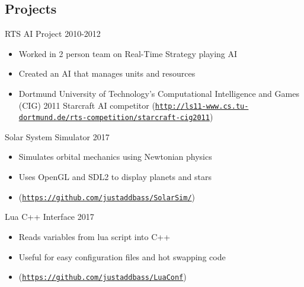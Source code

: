 \documentclass[line,margin]{res}
\begin{document}
\begin{resume}
\section{Projects}
\vspace{12pt}


RTS AI Project
\hfill 2010-2012
	\begin{itemize} \itemsep -2pt
	\item Worked in 2 person team on Real-Time Strategy playing AI
	\item Created an AI that manages units and resources
	\item Dortmund University of Technology’s Computational Intelligence and Games (CIG) 2011 Starcraft AI
        competitor (\href{http://ls11-www.cs.tu-dortmund.de/rts-competition/starcraft-cig2011}{\texttt{http://ls11-www.cs.tu-dortmund.de/rts-competition/starcraft-cig2011}})
	\end{itemize}

\vspace{6pt}
Solar System Simulator
\hfill 2017
	\begin{itemize} \itemsep -2pt
		\item Simulates orbital mechanics using Newtonian physics
		\item Uses OpenGL and SDL2 to display planets and stars
		\item (\href{https://github.com/justaddbass/SolarSim/}{\texttt{https://github.com/justaddbass/SolarSim/}})
	\end{itemize}

\vspace{6pt}
Lua C++ Interface
\hfill 2017
	\begin{itemize} \itemsep -2pt
		\item Reads variables from lua script into C++
		\item Useful for easy configuration files and hot swapping code
		\item (\href{https://github.com/justaddbass/LuaConf}{\texttt{https://github.com/justaddbass/LuaConf}})
		\end{itemize}


\end{resume}
\end{document}
